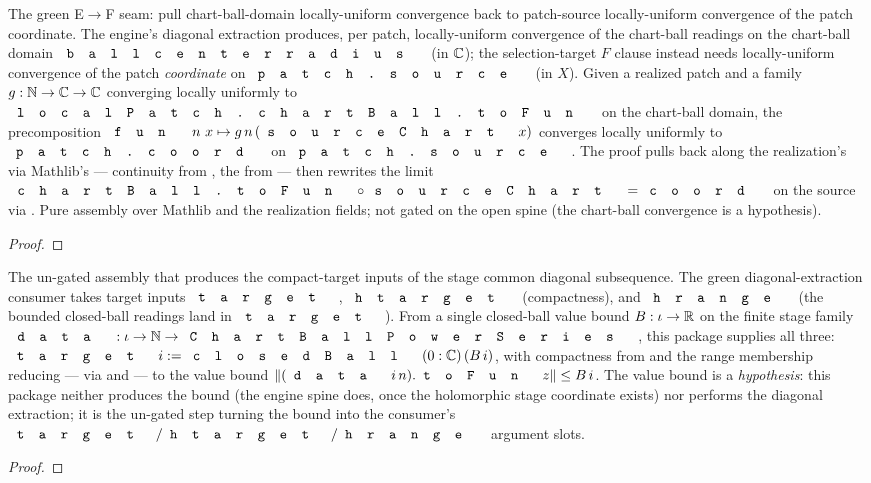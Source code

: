 \begin{lemma}
\label{lem:montel-realized-patch-coord-convergence-transfer}
The green E\(\to\)F seam: pull chart-ball-domain locally-uniform convergence back
to patch-source locally-uniform convergence of the patch coordinate. The engine's
diagonal extraction produces, per patch, locally-uniform convergence of the
chart-ball readings on the chart-ball domain \(\code{ball center radius}\)
(in \(\mathbb{C}\)); the selection-target \(F\) clause instead needs locally-uniform
convergence of the patch \emph{coordinate} on \(\code{patch.source}\) (in \(X\)).
Given a realized patch and a family \(g:\mathbb{N}\to\mathbb{C}\to\mathbb{C}\) converging locally
uniformly to \(\code{localPatch.chartBall.toFun}\) on the chart-ball domain, the
precomposition \(\code{fun}\ n\ x\mapsto g\,n\,(\code{sourceChart}\,x)\) converges
locally uniformly to \(\code{patch.coord}\) on \(\code{patch.source}\). The proof
pulls back along the realization's  via Mathlib's
 --- continuity from
, the  from
 --- then rewrites the limit
\(\code{chartBall.toFun}\circ\code{sourceChart}=\code{coord}\) on the source via
. Pure assembly over Mathlib and the realization
fields; not gated on the open spine (the chart-ball convergence is a hypothesis).
\leanok
\end{lemma}
\begin{proof}\leanok\end{proof}

\begin{lemma}
\label{lem:montel-stage-compact-target-package}
The un-gated assembly that produces the compact-target inputs of the stage common
diagonal subsequence. The green diagonal-extraction consumer takes target inputs
\(\code{target}\), \(\code{htarget}\) (compactness), and \(\code{hrange}\) (the
bounded closed-ball readings land in \(\code{target}\)). From a single closed-ball
value bound \(B:\iota\to\mathbb{R}\) on the finite stage family
\(\code{data}:\iota\to\N\to\code{ChartBallPowerSeries}\), this package supplies all
three: \(\code{target}\,i:=\code{closedBall}\,(0:\C)\,(B\,i)\), with compactness
from  and the range membership reducing --- via
 and 
--- to the value bound \(\|(\code{data}\,i\,n).\code{toFun}\,z\|\le B\,i\). The
value bound is a \emph{hypothesis}: this package neither produces the bound (the
engine spine does, once the holomorphic stage coordinate exists) nor performs the
diagonal extraction; it is the un-gated step turning the bound into the consumer's
\(\code{target}/\code{htarget}/\code{hrange}\) argument slots.
\leanok
\end{lemma}
\begin{proof}\leanok\end{proof}

